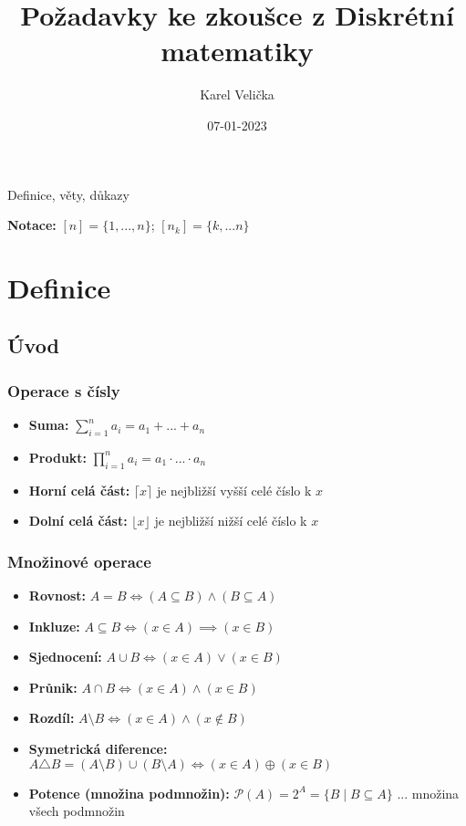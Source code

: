 \documentclass[10pt,a4paper]{article}
\title{Požadavky ke zkoušce z Diskrétní matematiky}
\date{07-01-2023}
\author{Karel Velička}
\begin{document}
\maketitle

\begin{center}
    Definice, věty, důkazy
\end{center}

\tableofcontents
\vspace*{\fill}
\textbf{Notace:} $[n] = \{1, ..., n\}$; $[n_k] = \{k, ... n\}$

\newpage
{}


\section{Definice}

\subsection{Úvod}

\subsubsection{Operace s čísly}

\begin{itemize}
    \item \textbf{Suma:} \(\displaystyle \sum_{i=1}^n a_i = a_1 + ... + a_n\)
    \item \textbf{Produkt:} \(\displaystyle \prod_{i=1}^n a_i = a_1 \cdot ... \cdot a_n\)
    \item \textbf{Horní celá část:} $\lceil x \rceil$ je nejbližší vyšší celé číslo k $x$
    \item \textbf{Dolní celá část:} $\lfloor x \rfloor$ je nejbližší nižší celé číslo k $x$
\end{itemize}

\subsubsection{Množinové operace}

\begin{itemize}
    \item \textbf{Rovnost:} $A = B \iff (A \subseteq B) \land (B \subseteq A)$
    \item \textbf{Inkluze:} $A\subseteq B \iff (x \in A) \implies (x\in B)$
    \item \textbf{Sjednocení:} $A\cup B \iff (x \in A) \lor (x \in B)$
    \item \textbf{Průnik:} $A\cap B \iff (x \in A) \land (x \in B)$
    \item \textbf{Rozdíl:} $A\setminus B \iff (x \in A) \land (x \notin B)$
    \item \textbf{Symetrická diference:} $A \triangle B = (A\setminus B) \cup (B\setminus A) \iff (x \in A) \oplus (x \in B)$
    \item \textbf{Potence (množina podmnožin):} $\mathcal{P}(A) = 2^A = \{B \mid B\subseteq A\}$ ... množina všech podmnožin
\end{itemize}
\end{document}
